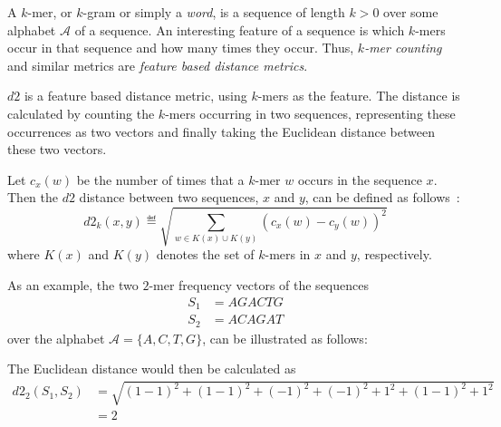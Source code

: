 A $k$-mer, or $k$-gram or simply a \emph{word}, is a sequence of length $k > 0$
over some alphabet $\mathcal{A}$ of a sequence. An interesting feature of a
sequence is which $k$-mers occur in that sequence and how many times they
occur. Thus, \emph{$k$-mer counting} and similar metrics are \emph{feature
based distance metrics}.

$d2$ is a feature based distance metric, using $k$-mers as the feature. The
distance is calculated by counting the $k$-mers occurring in two sequences,
representing these occurrences as two vectors and finally taking the Euclidean
distance between these two vectors.~\cite[pp.~53-54]{dong}

Let $c_x(w)$ be the number of times that a $k$-mer $w$ occurs in the sequence
$x$. Then the $d2$ distance between two sequences, $x$ and $y$, can be defined
as follows~\cite[pp.~1-2]{hazelhurst}:
\begin{equation}
  d2_k(x,y) \eqdef \sqrt{\sum_{w \in K(x) \cup K(y)} (c_x(w) - c_y(w))^2}
\end{equation}
where $K(x)$ and $K(y)$ denotes the set of $k$-mers in $x$ and $y$,
respectively.

As an example, the two $2$-mer frequency vectors of the sequences
\begin{align*}
  S_1 &= AGACTG \\
  S_2 &= ACAGAT
\end{align*}
over the alphabet $\mathcal{A} = \{A,C,T,G\}$, can be illustrated as follows:

\begin{table}[!h]
\centering
{}
\end{table}

The Euclidean distance would then be calculated as
\begin{align*}
  d2_2(S_1, S_2)
    &= \sqrt{(1-1)^2 + (1-1)^2 + (-1)^2 + (-1)^2 + 1^2 + (1-1)^2 + 1^2} \\
    &= 2
\end{align*}

